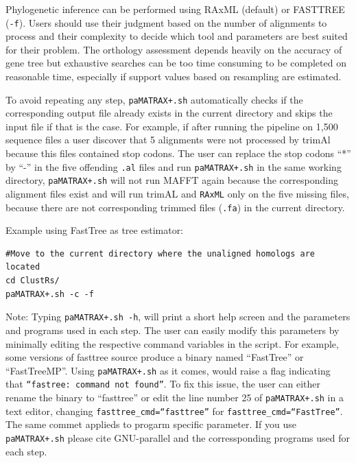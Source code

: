 \documentclass[10pt]{article}
\begin{document}
Phylogenetic inference can be performed using RAxML (default) or
FASTTREE (\texttt{-f}). Users should use their judgment based on the
number of alignments to process and their complexity to decide which
tool and parameters are best suited for their problem. The orthology
assessment depends heavily on the accuracy of gene tree but exhaustive
searches can be too time consuming to be completed on reasonable time,
especially if support values based on resampling are estimated.

To avoid repeating any step, \texttt{paMATRAX+.sh} automatically checks
if the corresponding  output file already exists in the current directory and skips
the input file if that is the case. For example, if after running the
pipeline on 1,500 sequence files a user discover that 5 alignments were not
processed by trimAl because this files contained stop codons. The user can replace the stop codons ``*'' by ``-'' in the five offending
\texttt{.al} files and run \texttt{paMATRAX+.sh} in the same working directory,
\texttt{paMATRAX+.sh} will not run MAFFT again because the
corresponding alignment files exist and will run trimAL and \texttt{RAxML} only on the
five missing files, because there are not corresponding trimmed files
(\texttt{.fa}) in the current directory.


Example using FastTree as tree estimator:

\begin{verbatim} 
#Move to the current directory where the unaligned homologs are located 
cd ClustRs/ 
paMATRAX+.sh -c -f

\end{verbatim}

Note: Typing \texttt{paMATRAX+.sh -h}, will print a short help screen
and the parameters and programs used in each step. The user can easily
modify this parameters by minimally editing the respective command
variables in the script. For example, some versions of fasttree source
produce a binary named ``FastTree'' or ``FastTreeMP''. Using
\texttt{paMATRAX+.sh} as it comes, would raise a flag indicating that
\texttt{``fastree: command not found''}. To fix this issue, the user can either rename
the binary to ``fasttree'' or edit the line number 25 of
\texttt{paMATRAX+.sh} in a text editor, changing
\texttt{fasttree\_cmd=``fasttree''} for
\texttt{fasttree\_cmd=``FastTree''}. The same commet applieds to
progarm specific parameter. If you use \texttt{paMATRAX+.sh} please
cite GNU-parallel and the corressponding programs used for each step.
\end{document}
